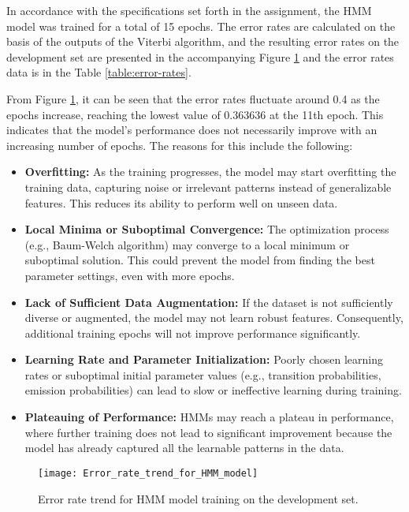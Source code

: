 \documentclass{article}
\begin{document}
In accordance with the specifications set forth in the assignment, the HMM model was trained for a total of 15 epochs. The error rates are calculated on the basis of the outputs of the Viterbi algorithm, and the resulting error rates on the development set are presented in the accompanying Figure \ref{fig:error-rate} and the error rates data is in the Table \ref{table:error-rates}.

From Figure \ref{fig:error-rate}, it can be seen that the error rates fluctuate around 0.4 as the epochs increase, reaching the lowest value of 0.363636 at the 11th epoch. This indicates that the model’s performance does not necessarily improve with an increasing number of epochs. The reasons for this include the following:

\begin{itemize}
	\item \textbf{Overfitting:} As the training progresses, the model may start overfitting the training data, capturing noise or irrelevant patterns instead of generalizable features. This reduces its ability to perform well on unseen data.
	\item \textbf{Local Minima or Suboptimal Convergence:} The optimization process (e.g., Baum-Welch algorithm) may converge to a local minimum or suboptimal solution. This could prevent the model from finding the best parameter settings, even with more epochs.
	\item \textbf{Lack of Sufficient Data Augmentation:} If the dataset is not sufficiently diverse or augmented, the model may not learn robust features. Consequently, additional training epochs will not improve performance significantly.
	\item \textbf{Learning Rate and Parameter Initialization:} Poorly chosen learning rates or suboptimal initial parameter values (e.g., transition probabilities, emission probabilities) can lead to slow or ineffective learning during training.
	\item \textbf{Plateauing of Performance:} HMMs may reach a plateau in performance, where further training does not lead to significant improvement because the model has already captured all the learnable patterns in the data.
\end{itemize}

\begin{figure}[!h]
\begin{center}
\texttt{[image: Error\_rate\_trend\_for\_HMM\_model]}
\end{center}
\caption{\label{fig:error-rate} Error rate trend for HMM model training on the development set.}
\end{figure}
\end{document}
